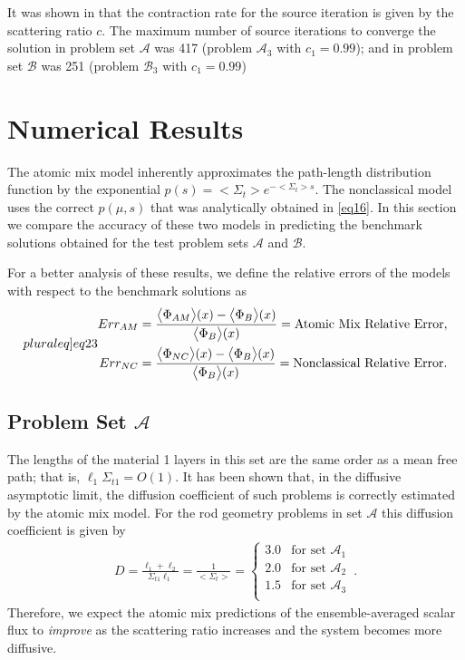 \documentclass[12pt]{article}
\newcommand{\bl}{\big<}
\newcommand{\bg}{\big>}
\newcommand{\seta}{\mathcal{A}}
\newcommand{\setb}{\mathcal{B}}
\begin{document}
{It was shown in \cite{kry13} that the contraction rate for the source iteration is given by the scattering ratio $c$. The maximum number of source iterations to converge the solution in problem set $\seta$ was 417 (problem $\seta_3$ with $c_1=0.99$);  and in problem set $\setb$ was 251 (problem $\setb_3$ with $c_1=0.99$)


\section{Numerical Results}\label{sec5}

The atomic mix model inherently approximates the path-length distribution function by the exponential $p(s) = \bl\Sigma_t\bg e^{-\bl\Sigma_t\bg s}$.
The nonclassical model uses the correct $p(\mu,s)$ that was analytically obtained in \cref{eq16}.
In this section we compare the accuracy of these two models in predicting the benchmark solutions obtained for the test problem sets $\seta$ and $\setb$. 

For a better analysis of these results, we define the relative errors of the models with respect to the benchmark solutions as
\begin{subequations}\label[pluraleq]{eq23}
\begin{align}
 Err_{AM}&= \frac{\bl\Phi_{AM}\bg(x)-\bl\Phi_B\bg(x)}{\bl\Phi_B\bg(x)}=\text{Atomic Mix Relative Error},\\
 Err_{NC}&= \frac{\bl\Phi_{NC}\bg(x)-\bl\Phi_B\bg(x)}{\bl\Phi_B\bg(x)}=\text{Nonclassical Relative Error}.
\end{align}
\end{subequations}

\subsection{Problem Set $\seta$}

The lengths of the material 1 layers in this set are the same order as a mean free path; that is, $\ell_1\Sigma_{t1} = O(1)$.
It has been shown \cite{larvas05} that, in the diffusive asymptotic limit, the diffusion coefficient of such problems is correctly estimated by the atomic mix model.
For the rod geometry problems in set $\seta$ this diffusion coefficient is given by
\begin{align}\label{eq24}
D = \frac{\ell_1+\ell_2}{\Sigma_{t1}\ell_1} = \frac{1}{\bl\Sigma_t\bg} =
\left\{
\begin{array}{cl}
3.0 & \text{for set $\seta_1$}\\
2.0 & \text{for set $\seta_2$}\\
1.5 & \text{for set $\seta_3$}\\
\end{array}
\right . \, .
\end{align}  
Therefore, we expect the atomic mix predictions of the ensemble-averaged scalar flux to {\em improve} as the scattering ratio increases and the system becomes more diffusive.

}
\end{document}
